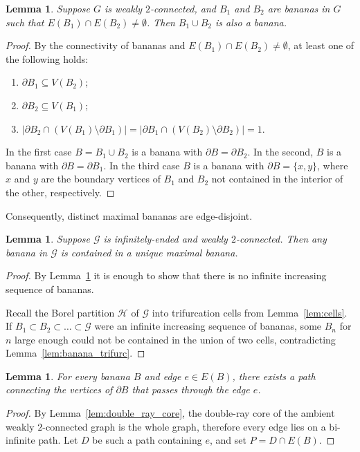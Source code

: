 \documentclass{article}
\theoremstyle{plain}
\newtheorem{lem}[thm]{Lemma}
\theoremstyle{definition}
\newcommand{\cG}{\mathcal{G}}
\newcommand{\cH}{\mathcal{H}}
\begin{document}
\begin{lem}\label{lem:banana_union}
Suppose $G$ is weakly $2$-connected, and $B_1$ and $B_2$ are bananas in $G$ such that $E(B_1)\cap E(B_2) \neq \emptyset$. Then $B_1 \cup B_2$ is also a banana.
\end{lem}
\begin{proof}
By the connectivity of bananas and $E(B_1) \cap E(B_2) \neq \emptyset$, at least one of the following holds:
\begin{enumerate}
    \item $\partial B_1 \subseteq V(B_2)$;
    \item $\partial B_2 \subseteq V(B_1)$;
    \item $|\partial B_2 \cap (V(B_1)\setminus\partial B_1)| = |\partial B_1 \cap (V(B_2)\setminus\partial B_2)| =1$. 
\end{enumerate}

In the first case $B=B_1 \cup B_2$ is a banana with $\partial B = \partial B_2$. In the second, $B$ is a banana with $\partial B = \partial B_1$. In the third case $B$ is a banana with $\partial B = \{x,y\}$, where $x$ and $y$ are the boundary vertices of $B_1$ and $B_2$ not contained in the interior of the other, respectively. 
\end{proof}

Consequently, distinct maximal bananas are edge-disjoint. 

\begin{lem}\label{lem:banana_largest}
Suppose $\cG$ is infinitely-ended and weakly $2$-connected. Then any banana in $\cG$ is contained in a unique maximal banana.
\end{lem}
\begin{proof}
    By Lemma~\ref{lem:banana_union} it is enough to show that there is no infinite increasing sequence of bananas.

    Recall the Borel partition $\cH$ of $\cG$ into trifurcation cells from Lemma~\ref{lem:cells}. If $B_1\subset B_2\subset\ldots\subset \cG$ were an infinite increasing sequence of bananas, some $B_n$ for $n$ large enough could not be contained in the union of two cells, contradicting Lemma~\ref{lem:banana_trifurc}.
\end{proof}


\begin{lem}\label{lem:path_in_a_banana}
    For every banana $B$ and edge $e\in E(B)$, there exists a path connecting the vertices of $\partial B$ that passes through the edge $e$.
\end{lem}
\begin{proof}

By Lemma~\ref{lem:double_ray_core}, the double-ray core of the ambient weakly $2$-connected graph is the whole graph, therefore every edge lies
on a bi-infinite path. Let $D$ be such a path containing $e$, and set
$P=D\cap E(B)$. 
\end{proof}
\end{document}
